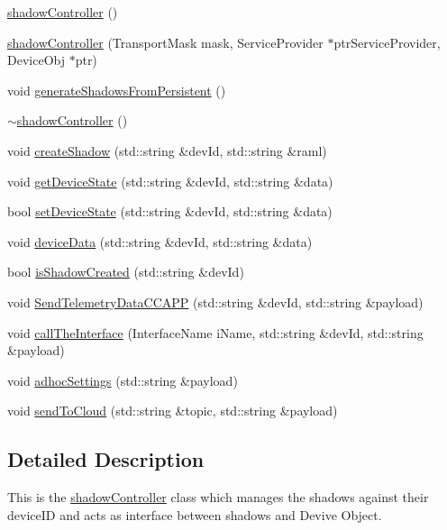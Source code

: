 \begin{DoxyCompactItemize}
\item 
\hyperlink{classshadowController_a6b20e008c8897a69644427f16feae567}{shadow\+Controller} ()
\item 
\hyperlink{classshadowController_a1634b86b0c3cbeba4bf59893f043ba70}{shadow\+Controller} (Transport\+Mask mask, Service\+Provider $\ast$ptr\+Service\+Provider, Device\+Obj $\ast$ptr)
\item 
void \hyperlink{classshadowController_a76614a8a202e8a76a33031ef947a4381}{generate\+Shadows\+From\+Persistent} ()
\item 
\hyperlink{classshadowController_a540130f287f68c79333af00f08a6e13b}{$\sim$shadow\+Controller} ()
\item 
void \hyperlink{classshadowController_ab5c10b60f81e8733b235d14f6f5cce94}{create\+Shadow} (std\+::string \&dev\+Id, std\+::string \&raml)
\item 
void \hyperlink{classshadowController_af9b3a7480ce2b9ed1fef2c1985003462}{get\+Device\+State} (std\+::string \&dev\+Id, std\+::string \&data)
\item 
bool \hyperlink{classshadowController_af09ea8c8a031af4508927f4eab6c820e}{set\+Device\+State} (std\+::string \&dev\+Id, std\+::string \&data)
\item 
void \hyperlink{classshadowController_aafca8ac3d715c752d529e98340e3cd79}{device\+Data} (std\+::string \&dev\+Id, std\+::string \&data)
\item 
bool \hyperlink{classshadowController_a385f84ce9b1db4c264de6389d40d8174}{is\+Shadow\+Created} (std\+::string \&dev\+Id)
\item 
void \hyperlink{classshadowController_ab062f91f1a6a7bef68b8ccd4dc5be330}{Send\+Telemetry\+Data\+C\+C\+A\+PP} (std\+::string \&dev\+Id, std\+::string \&payload)
\item 
void \hyperlink{classshadowController_a05080635d38b83e6577e89acf3ab3954}{call\+The\+Interface} (Interface\+Name i\+Name, std\+::string \&dev\+Id, std\+::string \&payload)
\item 
void \hyperlink{classshadowController_a42b847749d4f2cd926c23706527e6279}{adhoc\+Settings} (std\+::string \&payload)
\item 
void \hyperlink{classshadowController_a92a0b607d7683ffde25b40f126c59d1b}{send\+To\+Cloud} (std\+::string \&topic, std\+::string \&payload)
\end{DoxyCompactItemize}


\subsection{Detailed Description}
This is the \hyperlink{classshadowController}{shadow\+Controller} class which manages the shadows against their device\+ID and acts as interface between shadows and Devive Object. 

